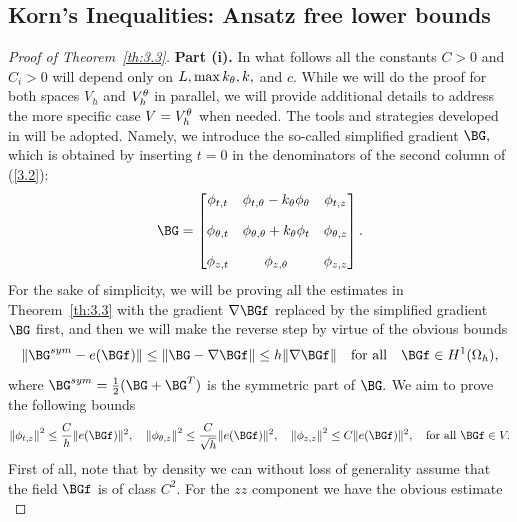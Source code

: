 \subsection{Korn's Inequalities: Ansatz free lower bounds}

\begin{proof}[Proof of Theorem~{\ref{th:3.3}}]
\textbf{Part (i).} In what follows all the constants $C>0$ and $C_i>0$ will depend only on $L,\max k_\theta,k,$ and $c.$ While we will do the proof for both spaces $V_h$ and $V_h^\theta$ in parallel, we will provide additional details to address the more specific case $V=V_h^\theta$ when needed. The tools and strategies developed in \cite{bib:Gra.Har.1,bib:Gra.Har.4,bib:Harutyunyan.1} will be adopted. Namely, we introduce the so-called simplified gradient $\BG,$ which is obtained by inserting $t=0$ in the denominators of the second column of (\ref{3.2}):
\begin{equation}
\label{4.11}
\BG=\begin{bmatrix} \phi_{t,t} & \phi_{t,\theta}-k_{\theta }\phi_\theta & \phi_{t,z}       \\[10pt]
\phi_{\theta,t} & \phi_{\theta,\theta}+k_{\theta }\phi_t& \phi_{\theta,z}      \\[10pt] 
\phi_{z,t} & \phi_{z,\theta}  & \phi_{z,z} \end{bmatrix}.
\end{equation}
For the sake of simplicity, we will be proving all the estimates in Theorem~\ref{th:3.3} with the gradient $\nabla\BGf$ replaced by the simplified gradient $\BG$ first, and then we will make the reverse step by virtue of the obvious bounds 
 \begin{equation}
\label{4.12}
\|\BG^{sym}-e(\BGf)\|\leq \|\BG-\nabla\BGf\|\leq h\|\nabla \BGf\|\quad \text{for all}\quad \BGf\in H^1(\Omega_h),
\end{equation}
where $\BG^{sym}=\frac{1}{2}(\BG+\BG^T)$ is the symmetric part of $\BG.$ We aim to prove the following bounds 
\begin{equation}
\label{4.13}
\left\|\phi_{t, z}\right\|^{2} \leq \frac{C}{h}\|e(\BGf)\|^{2},\quad
\left\|\phi_{\theta, z}\right\|^{2} \leq \frac{C}{\sqrt{h}}\|e(\BGf)\|^{2},\quad
\left\|\phi_{z, z}\right\|^{2} \leq C\|e(\BGf)\|^{2},\quad\text{for all}\ \BGf\in V.
\end{equation}
First of all, note that by density we can without loss of generality assume that the field $\BGf$ is of class $C^2.$ For the $zz$ component we have the obvious estimate 
\begin{equation}

\end{equation}
\end{proof}
